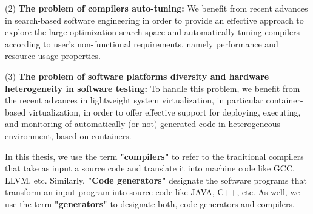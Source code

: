 	(2) \textbf{The problem of compilers auto-tuning:}  We benefit from recent advances in search-based software engineering in order to provide an effective approach to explore the large optimization search space and automatically tuning compilers according to user's non-functional requirements, namely performance and resource usage properties.

	(3) \textbf{The problem of software platforms diversity and hardware heterogeneity in software testing:} To handle this problem, we benefit from the recent advances in lightweight system virtualization, in particular container-based virtualization, in order to offer effective support for deploying, executing, and monitoring of automatically (or not) generated code in heterogeneous environment, based on containers.

In this thesis, we use the term \textbf{"compilers"} to refer to the traditional compilers that take as input a source code and translate it into machine code like GCC, LLVM, etc. Similarly, \textbf{"Code generators"} designate the software programs that transform an input program into source code like JAVA, C++, etc. As well, we use the term \textbf{"generators"} to designate both, code generators and compilers. 

